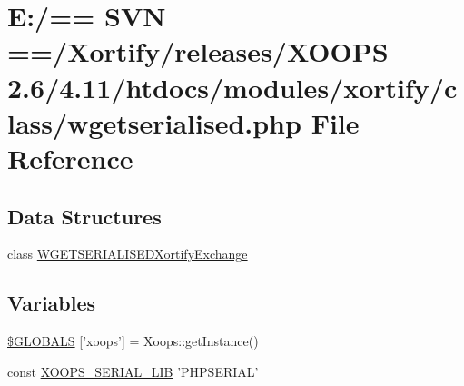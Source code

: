 \hypertarget{wgetserialised_8php}{\section{E\-:/== S\-V\-N ==/\-Xortify/releases/\-X\-O\-O\-P\-S 2.6/4.11/htdocs/modules/xortify/class/wgetserialised.php File Reference}
\label{wgetserialised_8php}
}
\subsection*{Data Structures}
\begin{DoxyCompactItemize}
\item 
class \hyperlink{class_w_g_e_t_s_e_r_i_a_l_i_s_e_d_xortify_exchange}{W\-G\-E\-T\-S\-E\-R\-I\-A\-L\-I\-S\-E\-D\-Xortify\-Exchange}
\end{DoxyCompactItemize}
\subsection*{Variables}
\begin{DoxyCompactItemize}
\item 
\hyperlink{wgetserialised_8php_ad10934112c0d18cf6b358d47afa6fcf1}{\$\-G\-L\-O\-B\-A\-L\-S} \mbox{[}'xoops'\mbox{]} = Xoops\-::get\-Instance()
\item 
const \hyperlink{wgetserialised_8php_a70ad743fdbf705daf2366b5cabf7a04d}{X\-O\-O\-P\-S\-\_\-\-S\-E\-R\-I\-A\-L\-\_\-\-L\-I\-B} 'P\-H\-P\-S\-E\-R\-I\-A\-L'
\end{DoxyCompactItemize}


